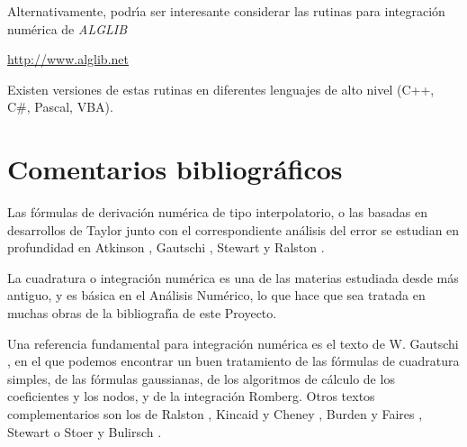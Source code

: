 Alternativamente, podr\'{\i}a ser
interesante considerar las rutinas para 
integraci\'on num\'erica de \textit{ALGLIB}

\url{http://www.alglib.net}

Existen versiones de estas rutinas en diferentes
lenguajes de alto nivel (C++, C\#, Pascal, VBA).


\section{Comentarios bibliogr\'aficos}

Las f\'{o}rmulas de derivaci\'{o}n num\'erica de tipo interpolatorio, o las basadas en desarrollos
de Taylor junto con el correspondiente an\'{a}lisis del
error  se estudian en profundidad en Atkinson \cite{At3}, Gautschi
\cite{Ga13}, Stewart \cite{stewart} y Ralston \cite{Ra}. 

La cuadratura o integraci\'on num\'erica es una de las materias estudiada desde m\'as antiguo, y 
es b\'asica en el An\'alisis Num\'erico, lo que hace que sea tratada en muchas obras de la
bibliograf\'\i a de este Proyecto. 

Una referencia fundamental para integraci\'on num\'erica es el
texto de W. Gautschi \cite{Ga13}, en el que podemos encontrar
un buen tratamiento de las f\'ormulas de cuadratura simples, de
las f\'ormulas gaussianas, de los algoritmos de c\'alculo de 
los coeficientes y los nodos, y de la integraci\'on Romberg. Otros
textos complementarios son los de Ralston 
\cite{Ra}, Kincaid y Cheney \cite{KCh},
Burden y Faires \cite{BF}, Stewart \cite{stewart} o Stoer
y Bulirsch \cite{SB}.
